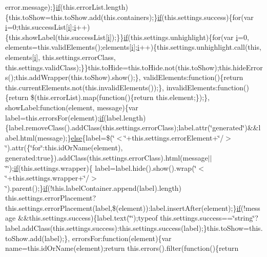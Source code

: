 \begin{DoxyCompactItemize}
error.\+message);\}\hyperlink{_scripts_2respond_8min_8js_a93851d60dd037a83509a1757b9ee7b66}{if}(this.\+error\+List.\+length)\{this.\+to\+Show=this.\+to\+Show.\+add(this.\+containers);\}\hyperlink{_scripts_2respond_8min_8js_a93851d60dd037a83509a1757b9ee7b66}{if}(this.\+settings.\+success)\{for(var \hyperlink{_scripts_2respond_8min_8js_a5e25b1d1bed9ab5f3174b76d6a722180}{i}=0;this.\+success\+List\mbox{[}\hyperlink{_scripts_2respond_8min_8js_a5e25b1d1bed9ab5f3174b76d6a722180}{i}\mbox{]};\hyperlink{_scripts_2respond_8min_8js_a5e25b1d1bed9ab5f3174b76d6a722180}{i}++)\{this.\+show\+Label(this.\+success\+List\mbox{[}\hyperlink{_scripts_2respond_8min_8js_a5e25b1d1bed9ab5f3174b76d6a722180}{i}\mbox{]});\}\}\hyperlink{_scripts_2respond_8min_8js_a93851d60dd037a83509a1757b9ee7b66}{if}(this.\+settings.\+unhighlight)\{for(var \hyperlink{_scripts_2respond_8min_8js_a5e25b1d1bed9ab5f3174b76d6a722180}{i}=0, elements=this.\+valid\+Elements();elements\mbox{[}\hyperlink{_scripts_2respond_8min_8js_a5e25b1d1bed9ab5f3174b76d6a722180}{i}\mbox{]};\hyperlink{_scripts_2respond_8min_8js_a5e25b1d1bed9ab5f3174b76d6a722180}{i}++)\{this.\+settings.\+unhighlight.\+call(this, elements\mbox{[}\hyperlink{_scripts_2respond_8min_8js_a5e25b1d1bed9ab5f3174b76d6a722180}{i}\mbox{]}, this.\+settings.\+error\+Class, this.\+settings.\+valid\+Class);\}\}this.\+to\+Hide=this.\+to\+Hide.\+not(this.\+to\+Show);this.\+hide\+Errors();this.\+add\+Wrapper(this.\+to\+Show).show();\}, valid\+Elements\+:function()\{return this.\+current\+Elements.\+not(this.\+invalid\+Elements());\}, invalid\+Elements\+:function()\{return \$(this.\+error\+List).map(function()\{return this.\+element;\});\}, show\+Label\+:function(element, message)\{var label=this.\+errors\+For(element);\hyperlink{_scripts_2respond_8min_8js_a93851d60dd037a83509a1757b9ee7b66}{if}(label.\+length)\{label.\+remove\+Class().add\+Class(this.\+settings.\+error\+Class);label.\+attr(\char`\"{}generated\char`\"{})\&\&label.\+html(message);\}\hyperlink{_scripts_2jquery_8validate_8js_a0544c3fe466e421738dae463968b70ba}{else}\{label=\$(\char`\"{}$<$\char`\"{}+this.\+settings.\+error\+Element+\char`\"{}/$>$\char`\"{}).attr(\{\char`\"{}for\char`\"{}\+:this.\+id\+Or\+Name(element), generated\+:true\}).add\+Class(this.\+settings.\+error\+Class).html(message$\vert$$\vert$\char`\"{}\char`\"{});\hyperlink{_scripts_2respond_8min_8js_a93851d60dd037a83509a1757b9ee7b66}{if}(this.\+settings.\+wrapper)\{   label=label.\+hide().show().wrap(\char`\"{}$<$\char`\"{}+this.\+settings.\+wrapper+\char`\"{}/$>$\char`\"{}).parent();\}\hyperlink{_scripts_2respond_8min_8js_a93851d60dd037a83509a1757b9ee7b66}{if}(!this.\+label\+Container.\+append(label).length) this.\+settings.\+error\+Placement?this.\+settings.\+error\+Placement(label,\$(element))\+:label.\+insert\+After(element);\}\hyperlink{_scripts_2respond_8min_8js_a93851d60dd037a83509a1757b9ee7b66}{if}(!message \&\&this.\+settings.\+success)\{label.\+text(\char`\"{}\char`\"{});typeof this.\+settings.\+success==\char`\"{}string\char`\"{}?label.\+add\+Class(this.\+settings.\+success)\+:this.\+settings.\+success(label);\}this.\+to\+Show=this.\+to\+Show.\+add(label);\}, errors\+For\+:function(element)\{var name=this.\+id\+Or\+Name(element);return this.\+errors().filter(function()\{return 
\end{DoxyCompactItemize}
